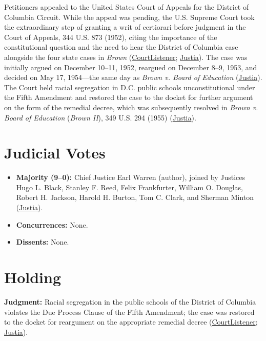 \documentclass[12pt]{article}
\begin{document}
Petitioners appealed to the United States Court of Appeals for the District of Columbia Circuit. While the appeal was pending, the U.S. Supreme Court took the extraordinary step of granting a writ of certiorari before judgment in the Court of Appeals, 344 U.S. 873 (1952), citing the importance of the constitutional question and the need to hear the District of Columbia case alongside the four state cases in \textit{Brown} (\href{https://www.courtlistener.com/opinion/105222/bolling-v-sharpe/}{CourtListener}; \href{https://supreme.justia.com/cases/federal/us/347/497/}{Justia}). The case was initially argued on December 10--11, 1952, reargued on December 8--9, 1953, and decided on May 17, 1954---the same day as \textit{Brown v. Board of Education} (\href{https://supreme.justia.com/cases/federal/us/347/497/}{Justia}). The Court held racial segregation in D.C. public schools unconstitutional under the Fifth Amendment and restored the case to the docket for further argument on the form of the remedial decree, which was subsequently resolved in \textit{Brown v. Board of Education} (\textit{Brown II}), 349 U.S. 294 (1955) (\href{https://supreme.justia.com/cases/federal/us/347/497/}{Justia}).

\section{Judicial Votes}

\begin{itemize}
  \item \textbf{Majority (9--0):} Chief Justice Earl Warren (author), joined by Justices Hugo L. Black, Stanley F. Reed, Felix Frankfurter, William O. Douglas, Robert H. Jackson, Harold H. Burton, Tom C. Clark, and Sherman Minton (\href{https://supreme.justia.com/cases/federal/us/347/497/}{Justia}).
  \item \textbf{Concurrences:} None.
  \item \textbf{Dissents:} None.
\end{itemize}

\section{Holding}

\textbf{Judgment:} Racial segregation in the public schools of the District of Columbia violates the Due Process Clause of the Fifth Amendment; the case was restored to the docket for reargument on the appropriate remedial decree (\href{https://www.courtlistener.com/opinion/105222/bolling-v-sharpe/}{CourtListener}; \href{https://supreme.justia.com/cases/federal/us/347/497/}{Justia}).
\end{document}
